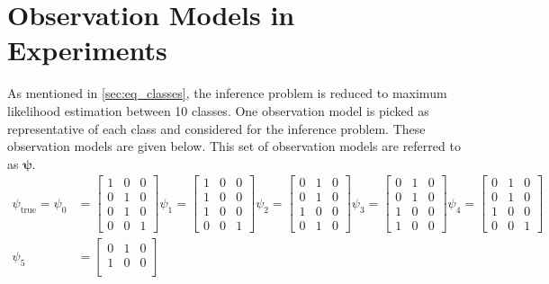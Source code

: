 \section{Observation Models in Experiments}
\label{ap:obs_set_exp}
As mentioned in \cref{sec:eq_classes}, the inference problem is reduced to maximum likelihood estimation between 10 classes. One observation model is picked as representative of each class and considered for the inference problem. These observation models are given below. This set of observation models are referred to as $ \symbf{\psi} $.
\begin{align}
\psi_{\text{true}} = \psi_{0} &=
\begin{bmatrix}
1 & 0 & 0 \\
0 & 1 & 0 \\
0 & 1 & 0 \\
0 & 0 & 1
\end{bmatrix}
\psi_{1} =
\begin{bmatrix}
1 & 0 & 0 \\
1 & 0 & 0 \\
1 & 0 & 0 \\
0 & 0 & 1
\end{bmatrix}
\psi_{2} =
\begin{bmatrix}
0 & 1 & 0 \\
0 & 1 & 0 \\
1 & 0 & 0 \\
0 & 1 & 0
\end{bmatrix}
\psi_{3} =
\begin{bmatrix}
0 & 1 & 0 \\
0 & 1 & 0 \\
1 & 0 & 0 \\
1 & 0 & 0
\end{bmatrix}
\psi_{4} =
\begin{bmatrix}
0 & 1 & 0 \\
0 & 1 & 0 \\
1 & 0 & 0 \\
0 & 0 & 1
\end{bmatrix} \nonumber\\
\psi_{5} &=
\begin{bmatrix}
0 & 1 & 0 \\
1 & 0 & 0 \\

\end{bmatrix}
\end{align}
